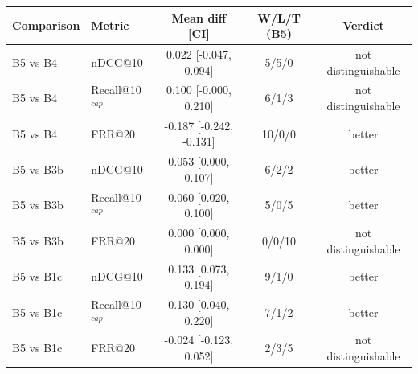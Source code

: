\begin{tabular}{llccc}
\toprule
Comparison & Metric & Mean diff [CI] & W/L/T (B5) & Verdict \\
\midrule
B5 vs B4 & nDCG@10 & 0.022 [-0.047, 0.094] & 5/5/0 & not distinguishable \\
B5 vs B4 & Recall@10$^{cap}$ & 0.100 [-0.000, 0.210] & 6/1/3 & not distinguishable \\
B5 vs B4 & FRR@20 & -0.187 [-0.242, -0.131] & 10/0/0 & better \\
B5 vs B3b & nDCG@10 & 0.053 [0.000, 0.107] & 6/2/2 & better \\
B5 vs B3b & Recall@10$^{cap}$ & 0.060 [0.020, 0.100] & 5/0/5 & better \\
B5 vs B3b & FRR@20 & 0.000 [0.000, 0.000] & 0/0/10 & not distinguishable \\
B5 vs B1c & nDCG@10 & 0.133 [0.073, 0.194] & 9/1/0 & better \\
B5 vs B1c & Recall@10$^{cap}$ & 0.130 [0.040, 0.220] & 7/1/2 & better \\
B5 vs B1c & FRR@20 & -0.024 [-0.123, 0.052] & 2/3/5 & not distinguishable \\
\bottomrule
\end{tabular}
